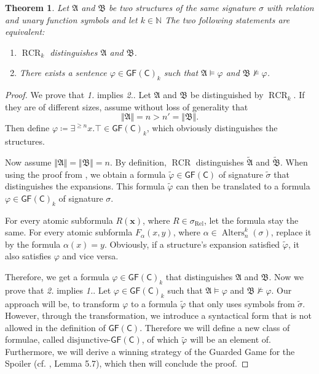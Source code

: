 \documentclass[a4paper,11pt,DIV=15]{scrartcl} %
\renewcommand{\phi}{\varphi}
\theoremstyle{plain}
\newtheorem{theorem}{Theorem}
\theoremstyle{definition}
\newcommand{\GFC}{\mathsf{GF}(\mathsf{C})}
\newcommand{\RCR}{\operatorname{RCR}}
\begin{document}
\begin{theorem}
	Let $\mathfrak A$ and $\mathfrak B$ be two structures of the same signature $\sigma$ with relation and unary function symbols and let $k\in \mathbb{N}$
	The two following statements are equivalent:
	\begin{enumerate}
		\item $\RCR_k$ distinguishes $\mathfrak A$ and $\mathfrak B$.
		\item There exists a sentence $\phi\in\GFC_k$ such that $\mathfrak A\models \phi$ and $\mathfrak B\not\models \phi$.
	\end{enumerate}
\end{theorem}
\begin{proof}
	We prove that \emph{1.} implies \emph{2.}. 
	Let $\mathfrak A$ and $\mathfrak B$ be distinguished by $\RCR_k$.
	If they are of different sizes, assume without loss of generality that 
	$$\Vert \mathfrak A \Vert =n > n'=\Vert \mathfrak B \Vert.$$
	Then define $\phi\coloneqq \exists^{\geq n} x. \top\in \GFC_k$, which obviously distinguishes the structures.
	
	Now assume $\Vert \mathfrak A\Vert = \Vert \mathfrak B \Vert = n$.
	By definition, $\RCR$ distinguishes $\widetilde{\mathfrak A}$ and $\widetilde{\mathfrak B}$.
	When using the proof from \cite{scheidt2025ColorRefinement}, we obtain a formula $\widetilde{\phi}\in \GFC$ of signature $\widetilde{\sigma}$ that distinguishes the expansions.
	This formula $\widetilde{\phi}$ can then be translated to a formula $\phi\in\GFC_k$ of signature $\sigma$.
	
	For every atomic subformula $R(\mathbf x)$, where $R\in \sigma_{\operatorname{Rel}}$, let the formula stay the same.
	For every atomic subformla $F_\alpha(x,y)$, where $\alpha\in \operatorname{Alters}_n^k(\sigma)$, replace it by the formula $\alpha(x)=y$. Obviously, if a structure's expansion satisfied $\widetilde{\phi}$, it also satisfies $\phi$ and vice versa.
	
	Therefore, we get a formula $\phi\in \GFC_k$ that distinguishes $\mathfrak A$ and $\mathfrak B$.
	\break
	Now we prove that \emph{2.} implies \emph{1.}.
	Let $\phi\in \GFC_k$ such that $\mathfrak A\models \phi$ and $\mathfrak B\not\models \phi$.
	Our approach will be, to transform $\phi$ to a formula $\widetilde{\phi}$ that only uses symbols from $\widetilde{\sigma}$.
	However, through the transformation, we introduce a syntactical form that is not allowed in the definition of $\GFC$.
	Therefore we will define a new class of formulae, called $\text{disjunctive-}\GFC$, of which $\widetilde{\phi}$ will be an element of.
	Furthermore, we will derive a winning strategy of the Guarded Game for the Spoiler (cf. \cite{scheidt2025ColorRefinement}, Lemma 5.7), which then will conclude the proof.
	

\end{proof}
\end{document}
